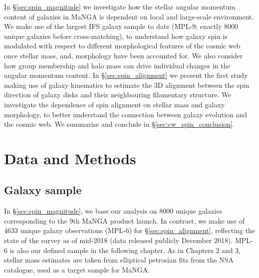 In \S\ref{sec:spin_magnitude} we investigate how the stellar angular momentum content of galaxies in MaNGA is dependent on local and large-scale environment. We make use of the largest IFS galaxy sample to date (MPL-9; exactly 8000 unique galaxies before cross-matching), to understand how galaxy spin is modulated with respect to different morphological features of the cosmic web once stellar mass, and, morphology have been accounted for. We also consider how group membership and halo mass can drive individual changes in the angular momentum content. In \S\ref{sec:spin_alignment} we present the first study making use of galaxy kinematics to estimate the 3D alignment between the spin direction of galaxy disks and their neighbouring filamentary structure. We investigate the dependence of spin alignment on stellar mass and galaxy morphology, to better understand the connection between galaxy evolution and the cosmic web. We summarise and conclude in \S\ref{sec:cw_spin_conclusion}.

\section{Data and Methods}
\subsection{Galaxy sample} \label{sec:spin_galaxy_sample}
In \S\ref{sec:spin_magnitude}, we base our analysis on 8000 unique galaxies corresponding to the 9th MaNGA product launch. In contrast, we make use of 4633 unique galaxy observations (MPL-6) for \S\ref{sec:spin_alignment}, reflecting the state of the survey as of mid-2018 (data released publicly December 2018). MPL-6 is also our defined sample in the following chapter. As in Chapters 2 and 3, stellar mass estimates are taken from elliptical petrosian fits from the NSA catalogue, used as a target sample for MaNGA. 


